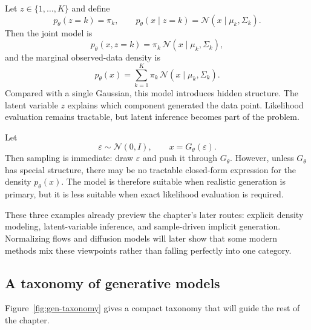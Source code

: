 \begin{example}
Let $z\in\{1,\dots,K\}$ and define
\[
p_\theta(z=k)=\pi_k,
\qquad
p_\theta(x\mid z=k)=\mathcal{N}(x\mid \mu_k,\Sigma_k).
\]
Then the joint model is
\[
p_\theta(x,z=k)=\pi_k\,\mathcal{N}(x\mid \mu_k,\Sigma_k),
\]
and the marginal observed-data density is
\[
p_\theta(x)=\sum_{k=1}^K \pi_k\,\mathcal{N}(x\mid \mu_k,\Sigma_k).
\]
Compared with a single Gaussian, this model introduces hidden structure.
The latent variable $z$ explains which component generated the data point.
Likelihood evaluation remains tractable, but latent inference becomes part of the problem.
\end{example}

\begin{example}
Let
\[
\varepsilon \sim \mathcal{N}(0,I),
\qquad
x = G_\theta(\varepsilon).
\]
Then sampling is immediate: draw $\varepsilon$ and push it through $G_\theta$.
However, unless $G_\theta$ has special structure, there may be no tractable closed-form expression for the density $p_\theta(x)$.
The model is therefore suitable when realistic generation is primary, but it is less suitable when exact likelihood evaluation is required.
\end{example}

These three examples already preview the chapter's later routes:
explicit density modeling, latent-variable inference, and sample-driven implicit generation.
Normalizing flows and diffusion models will later show that some modern methods mix these viewpoints rather than falling perfectly into one category.

\subsection*{A taxonomy of generative models}

Figure~\ref{fig:gen-taxonomy} gives a compact taxonomy that will guide the rest of the chapter.

